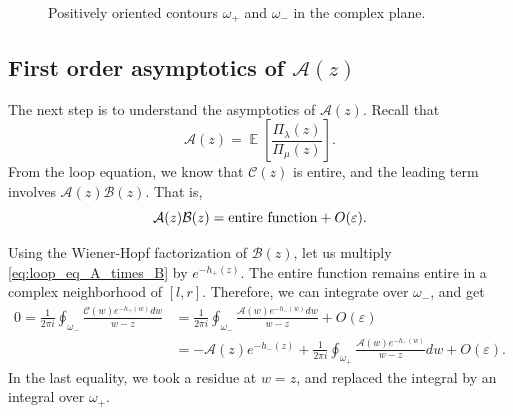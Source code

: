 \documentclass[letterpaper,11pt,oneside,reqno]{article}
\numberwithin{equation}{section}
\theoremstyle{definition}
\begin{document}
\begin{figure}[htpb]
	\centering
	\caption{Positively oriented contours $\omega_+$ and $\omega_-$ in the complex plane.}
	\label{fig:contours}
\end{figure}

\subsection{First order asymptotics of $\mathcal{A}(z)$}

The next step is to understand the asymptotics of $\mathcal{A}(z)$. Recall that 
\begin{equation}
	\label{eq:A_definition}
	\mathcal{A}(z)=\operatorname{\mathbb{E}}\left[ \frac{\Pi_\lambda(z)}{\Pi_\mu(z)} \right].
\end{equation}
From the loop equation, we know that $\mathcal{C}(z)$ is entire, and the leading term involves $\mathcal{A}(z)\mathcal{B}(z)$. That is,
\begin{equation}
	\label{eq:loop_eq_A_times_B}
	\mathcal{A}(z)\mathcal{B}(z) = \textnormal{entire function} + O(\varepsilon).
\end{equation}

Using the Wiener-Hopf factorization of $\mathcal{B}(z)$, let
us multiply \eqref{eq:loop_eq_A_times_B}
by $e^{-h_+(z)}$. The entire function remains entire in a complex
neighborhood of $[l,r]$. Therefore, we can integrate over $\omega_-$, and get
\begin{align*}
	0=
	\frac{1}{2\pi i}\oint_{\omega_-}\frac{\mathcal{C}(w)e^{-h_+(w)}dw}{w-z}
	&=
	\frac{1}{2\pi i}\oint_{\omega_-}\frac{\mathcal{A}(w)e^{-h_-(w)}dw}{w-z}+O(\varepsilon)
	\\&=
	-\mathcal{A}(z)e^{-h_-(z)}+\frac{1}{2\pi i}\oint_{\omega_+}
	\frac{\mathcal{A}(w)e^{-h_-(w)}}{w-z}dw+O(\varepsilon).
\end{align*}
In the last equality, we took a residue at $w=z$, and replaced the integral
by an integral over $\omega_+$.
\end{document}
